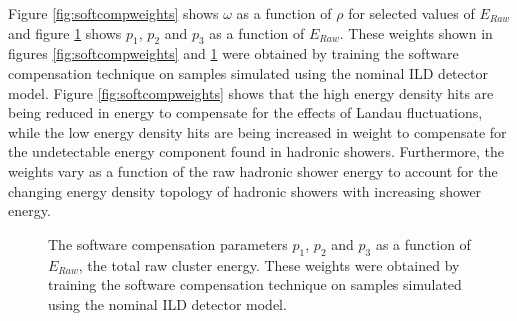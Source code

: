 Figure \ref{fig:softcompweights} shows $\omega$ as a function of $\rho$ for selected values of $E_{Raw}$ and figure \ref{fig:softcompparams} shows $p_{1}$, $p_{2}$ and $p_{3}$ as a function of $E_{Raw}$.  These weights shown in figures \ref{fig:softcompweights} and \ref{fig:softcompparams} were obtained by training the software compensation technique on samples simulated using the nominal ILD detector model.  Figure \ref{fig:softcompweights} shows that the high energy density hits are being reduced in energy to compensate for the effects of Landau fluctuations, while the low energy density hits are being increased in weight to compensate for the undetectable energy component found in hadronic showers.  Furthermore, the weights vary as a function of the raw hadronic shower energy to account for the changing energy density topology of hadronic showers with increasing shower energy.

\begin{figure}[h!]
\caption[The software compensation parameters \protect{} $p_{1}$, \protect{} $p_{2}$ and \protect{} $p_{3}$ as a function of $E_{Raw}$, the total raw cluster energy.  These weights were obtained by training the software compensation technique on samples simulated using the nominal ILD detector model.]{The software compensation parameters \protect{} $p_{1}$, \protect{} $p_{2}$ and \protect{} $p_{3}$ as a function of $E_{Raw}$, the total raw cluster energy.  These weights were obtained by training the software compensation technique on samples simulated using the nominal ILD detector model.}
\label{fig:softcompparams}
\end{figure}

